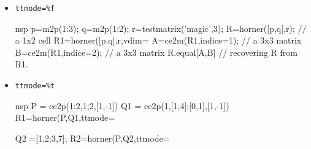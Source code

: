 \begin{examples}
  \begin{itemize}
  \item \verb!ttmode=%f!
    \begin{mintednsp}{nsp}
      p=m2p(1:3);
      q=m2p(1:2);
      r=testmatrix('magic',3);
      R=horner([p,q],r); // a 1x2 cell 
      R1=horner([p,q],r,vdim=%
      A=ce2m(R1,indice=1); // a 3x3 matrix 
      B=ce2m(R1,indice=2); // a 3x3 matrix 
      R.equal[{A,B}]  // recovering R from R1.
    \end{mintednsp}
  \item \verb!ttmode=%t!
    \begin{mintednsp}{nsp}
      P = ce2p({1:2,1;2,[1,-1]})
      Q1 = ce2p({1,[1,4];[0,1],[1,-1]})
      R1=horner(P,Q1,ttmode=%
      
      Q2 =[1,2;3,7];
      R2=horner(P,Q2,ttmode=%
    \end{mintednsp}
  \end{itemize}
\end{examples}

